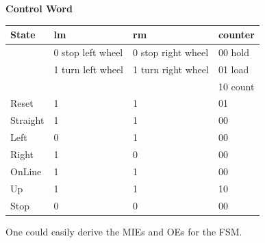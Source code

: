 \begin{enumerate}
\begin{solution}
{{\bf Control Word}

\begin{tabular}{l|l|l|l}
State & lm		  & rm			& counter \\ \hline
      & 0 stop left wheel & 0 stop right wheel  & 00 hold \\ \hline
      & 1 turn left wheel & 1 turn right wheel  & 01 load \\ \hline
      &                   &                     & 10 count\\ \hline \hline
Reset	 & 1		  & 1			& 01	  \\ \hline
Straight & 1		  & 1			& 00	  \\ \hline
Left     & 0		  & 1			& 00	  \\ \hline
Right    & 1		  & 0			& 00	  \\ \hline
OnLine   & 1		  & 1			& 00	  \\ \hline
Up	 & 1		  & 1			& 10	  \\ \hline
Stop	 & 0		  & 0			& 00	  \\ 
\end{tabular}

One could easily derive the MIEs and OEs for the FSM.
} \end{solution}


\end{enumerate}
